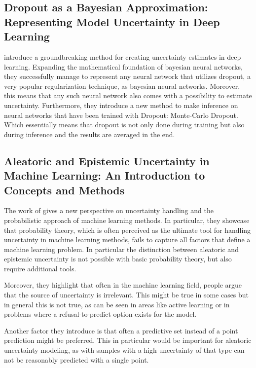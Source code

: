 \documentclass{article}
\begin{document}

\subsection{Dropout as a Bayesian Approximation: Representing Model Uncertainty in Deep Learning}

\cite{gal_dropout_2016} introduce a groundbreaking method for creating uncertainty estimates in deep learning. Expanding the mathematical foundation of bayesian neural networks, they successfully manage to represent any neural network that utilizes dropout, a very popular regularization technique, as bayesian neural networks. Moreover, this means that any such neural network also comes with a possibility to estimate uncertainty. Furthermore, they introduce a new method to make inference on neural networks that have been trained with Dropout: Monte-Carlo Dropout. Which essentially means that dropout is not only done during training but also during inference and the results are averaged in the end. 


\subsection{Aleatoric and Epistemic Uncertainty in Machine Learning: An Introduction to Concepts and Methods}
The work of \cite{hullermeier_aleatoric_2021} gives a new perspective on uncertainty handling and the probabilistic approach of machine learning methods. In particular, they showcase that probability theory, which is often perceived as the ultimate tool for handling uncertainty in machine learning methods, fails to capture all factors that define a machine learning problem. In particular the distinction between aleatoric and epistemic uncertainty is not possible with basic probability theory, but also require additional tools.

Moreover, they highlight that often in the machine learning field, people argue that the source of uncertainty is irrelevant. This might be true in some cases but in general this is not true, as can be seen in areas like active learning or in problems where a refusal-to-predict option exists for the model.

Another factor they introduce is that often a predictive set instead of a point prediction might be preferred. This in particular would be important for aleatoric uncertainty modeling, as with samples with a high uncertainty of that type can not be reasonably predicted with a single point.
\end{document}
